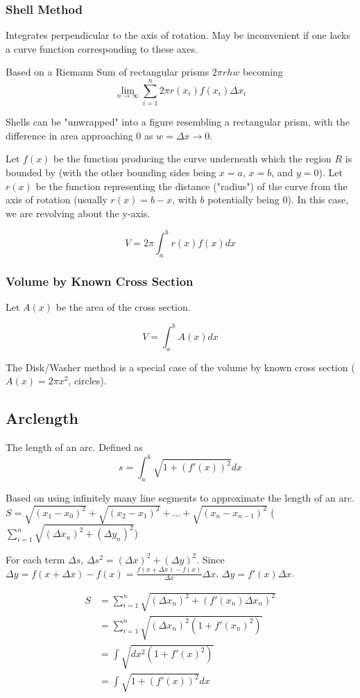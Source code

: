 \documentclass{article}
\begin{document}
\subsubsection{Shell Method}
Integrates perpendicular to the axis of rotation. May be inconvenient if one lacks a curve function corresponding to these axes.

Based on a Riemann Sum of rectangular prisms $2 \pi rhw$ becoming
$$\lim_{n \to \infty} \sum_{i=1}^{n} 2 \pi r(x_i) f(x_i) \Delta x_i$$

Shells can be "unwrapped" into a figure resembling a rectangular prism, with the difference in area approaching $0$ as $w = \Delta x \to 0$.

Let $f(x)$ be the function producing the curve underneath which the region $R$ is bounded by (with the other bounding sides being $x = a$, $x = b$, and $y = 0$). Let $r(x)$ be the function representing the distance ("radius") of the curve from the axis of rotation (usually $r(x) = b - x$, with $b$ potentially being $0$). In this case, we are revolving about the y-axis.

$$V = 2\pi \int_{a}^{b} r(x)f(x) dx$$

\subsubsection{Volume by Known Cross Section}
Let $A(x)$ be the area of the cross section.

$$V = \int_{a}^{b} A(x)dx$$

The Disk/Washer method is a special case of the volume by known cross section ($A(x) = 2\pi x^2$, circles).

\subsection{Arclength}
The length of an arc. Defined as
$$ s = \int_{a}^{b} \sqrt{1+(f'(x))^2} dx$$

Based on using infinitely many line segments to approximate the length of an arc.
$S = \sqrt{(x_1-x_0)^2} + \sqrt{(x_2-x_1)^2} + ... + \sqrt{(x_n-x_{n-1})^2}$ ($\sum_{i=1}^n \sqrt{(\Delta x_n)^2 + (\Delta y_n)^2}$)

For each term $\Delta s$, $\Delta s^2 = (\Delta x)^2 + (\Delta y)^2$.
Since  $\Delta y = f(x + \Delta x) - f(x) = \frac{f(x + \Delta x) - f(x)}{\Delta x}\Delta x$, $\Delta y = f'(x)\Delta x$.

\begin{align*}
    S & = \sum_{i=1}^n \sqrt{(\Delta x_n)^2 + (f'(x_n)\Delta x_n)^2} \\
      & = \sum_{i=1}^n \sqrt{(\Delta x_n)^2(1 + f'(x_n)^2)} \\
      & = \int \sqrt{dx^2(1 + f'(x)^2)} \\
      & = \int \sqrt{1 + (f'(x))^2} dx
\end{align*}
\end{document}

